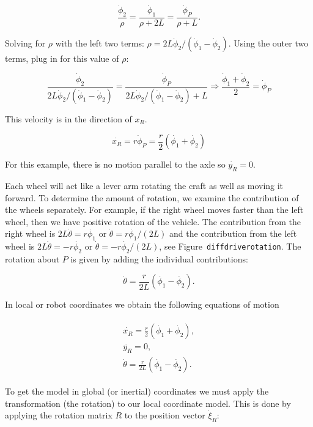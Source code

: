 \[\displaystyle \frac{\dot{\phi}_2}{\rho} = \frac{\dot{\phi}_1}{\rho +2L} =  \frac{\dot{\phi}_P}{\rho +L} .\]

Solving for \(\rho\) with the left two terms:
\(\rho  = 2L\dot{\phi}_2/ (\dot{\phi}_1 - \dot{\phi}_2)\). Using the
outer two terms, plug in for this value of \(\rho\):

\[\displaystyle \frac{\dot{\phi}_2}{2L\dot{\phi}_2/ (\dot{\phi}_1 - \dot{\phi}_2)} =  \frac{\dot{\phi}_P}{2L\dot{\phi}_2/ (\dot{\phi}_1 - \dot{\phi}_2)+L}  \Rightarrow
\displaystyle \frac{\dot{\phi}_1 + \dot{\phi}_2}{2}=  \dot{\phi}_P\]

This velocity is in the direction of \(x_R\).

\[\dot{x_R} = r\dot{\phi}_P =
\frac{r}{2} (\dot{\phi_1} + \dot{\phi_2})\]

For this example, there is no motion parallel to the axle so
\(\dot{y_R} = 0\).

Each wheel will act like a lever arm rotating the craft as well as
moving it forward. To determine the amount of rotation, we examine the
contribution of the wheels separately. For example, if the right wheel
moves faster than the left wheel, then we have positive rotation of the
vehicle. The contribution from the right wheel is
\(2L\dot{\theta} = r\dot{\phi_1}\) or
\(\dot{\theta} = r\dot{\phi_1}/(2L)\) and the contribution from the left
wheel is \(2L\dot{\theta} = -r\dot{\phi_2}\) or
\(\dot{\theta} = -r\dot{\phi_2}/(2L)\), see
Figure~\texttt{diffdriverotation}. The rotation about \(P\) is given by
adding the individual contributions:

\[\dot{\theta} =  \frac{r}{2L} (\dot{\phi_1} - \dot{\phi_2}).\]

In local or robot coordinates we obtain the following equations of
motion

\[\begin{aligned}
\begin{array}{l}
\dot{x_R} = \frac{r}{2} (\dot{\phi_1} + \dot{\phi_2}),\\[2mm]
\dot{y_R} = 0,\\[2mm]
\dot{\theta} =  \frac{r}{2L} (\dot{\phi_1} - \dot{\phi_2}).
\end{array}
\end{aligned}\]

To get the model in global (or inertial) coordinates we must apply the
transformation (the rotation) to our local coordinate model. This is
done by applying the rotation matrix \(R\) to the position vector
\(\dot{\xi}_R\):

